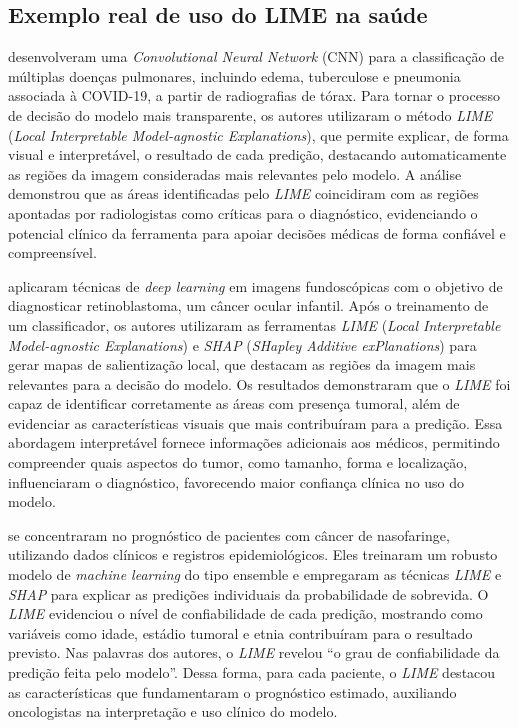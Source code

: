 \subsection{Exemplo real de uso do LIME na saúde}
 desenvolveram uma \textit{Convolutional Neural Network} (CNN) para a classificação de múltiplas doenças pulmonares, incluindo edema, tuberculose e pneumonia associada à COVID-19, a partir de radiografias de tórax. Para tornar o processo de decisão do modelo mais transparente, os autores utilizaram o método \textit{LIME} (\textit{Local Interpretable Model-agnostic Explanations}), que permite explicar, de forma visual e interpretável, o resultado de cada predição, destacando automaticamente as regiões da imagem consideradas mais relevantes pelo modelo. A análise demonstrou que as áreas identificadas pelo \textit{LIME} coincidiram com as regiões apontadas por radiologistas como críticas para o diagnóstico, evidenciando o potencial clínico da ferramenta para apoiar decisões médicas de forma confiável e compreensível.

 aplicaram técnicas de \textit{deep learning} em imagens fundoscópicas com o objetivo de diagnosticar retinoblastoma, um câncer ocular infantil. Após o treinamento de um classificador, os autores utilizaram as ferramentas \textit{LIME} (\textit{Local Interpretable Model-agnostic Explanations}) e \textit{SHAP} (\textit{SHapley Additive exPlanations}) para gerar mapas de salientização local, que destacam as regiões da imagem mais relevantes para a decisão do modelo. Os resultados demonstraram que o \textit{LIME} foi capaz de identificar corretamente as áreas com presença tumoral, além de evidenciar as características visuais que mais contribuíram para a predição. Essa abordagem interpretável fornece informações adicionais aos médicos, permitindo compreender quais aspectos do tumor, como tamanho, forma e localização, influenciaram o diagnóstico, favorecendo maior confiança clínica no uso do modelo.

 se concentraram no prognóstico de pacientes com câncer de nasofaringe, utilizando dados clínicos e registros epidemiológicos. Eles treinaram um robusto modelo de \textit{machine learning} do tipo ensemble e empregaram as técnicas \textit{LIME} e \textit{SHAP} para explicar as predições individuais da probabilidade de sobrevida. O \textit{LIME} evidenciou o nível de confiabilidade de cada predição, mostrando como variáveis como idade, estádio tumoral e etnia contribuíram para o resultado previsto. Nas palavras dos autores, o \textit{LIME} revelou “o grau de confiabilidade da predição feita pelo modelo”. Dessa forma, para cada paciente, o \textit{LIME} destacou as características que fundamentaram o prognóstico estimado, auxiliando oncologistas na interpretação e uso clínico do modelo.


